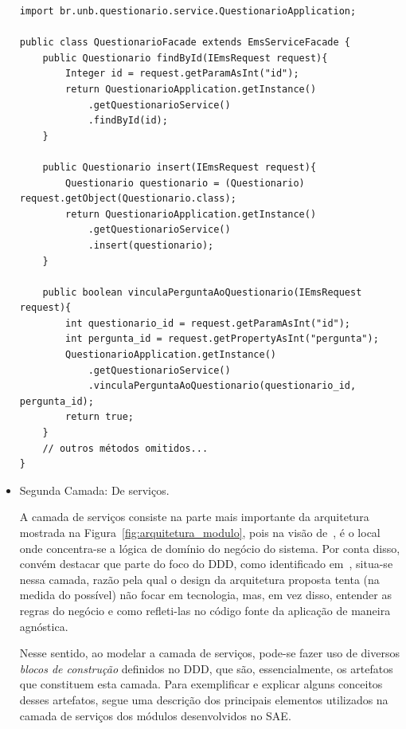 \begin{itemize}
\begin{lstlisting}[caption=Exemplo de fachada para o serviço QuestionarioService., label=fig:exemplo_fachada]
import br.unb.questionario.service.QuestionarioApplication;

public class QuestionarioFacade extends EmsServiceFacade {
	public Questionario findById(IEmsRequest request){
		Integer id = request.getParamAsInt("id");
		return QuestionarioApplication.getInstance()
			.getQuestionarioService()
			.findById(id);
	}
	
	public Questionario insert(IEmsRequest request){
		Questionario questionario = (Questionario) request.getObject(Questionario.class);
		return QuestionarioApplication.getInstance()
			.getQuestionarioService()
			.insert(questionario);
	}
	
	public boolean vinculaPerguntaAoQuestionario(IEmsRequest request){
		int questionario_id = request.getParamAsInt("id");
		int pergunta_id = request.getPropertyAsInt("pergunta");
		QuestionarioApplication.getInstance()
			.getQuestionarioService()
			.vinculaPerguntaAoQuestionario(questionario_id, pergunta_id);
		return true;
	}
	// outros métodos omitidos...
}
\end{lstlisting}
	
	
	\item Segunda Camada: De serviços.
	
	A camada de serviços consiste na parte mais 
	importante da arquitetura mostrada na Figura~\ref{fig:arquitetura_modulo}, 
	pois na visão de~\cite{evans2004domain, fowler2002patterns},
	é o local onde	concentra-se a lógica de domínio do negócio do sistema.
	Por conta disso, convém destacar que parte
	do foco do \acrshort{DDD},
	como identificado em~\cite{evans2004domain, fowler2002patterns}, 
	situa-se nessa camada, razão pela qual
	o design da arquitetura proposta
	tenta (na medida do possível) 
	não focar em tecnologia, 
	mas, em vez disso, entender as regras do negócio e
	como refleti-las no código fonte da aplicação 
	de maneira agnóstica.

	Nesse sentido, ao modelar a camada de serviços, 
	pode-se fazer uso de diversos \emph{blocos 
	de construção} definidos no \acrshort{DDD},
	que são, essencialmente, os artefatos que constituem
	esta camada. Para exemplificar e explicar 
	alguns conceitos desses artefatos, 
	segue uma descrição
	dos principais elementos utilizados na camada de serviços 
	dos módulos desenvolvidos no \acrshort{SAE}. 
	
	\begin{itemize}
	

\end{itemize}
\end{itemize}
